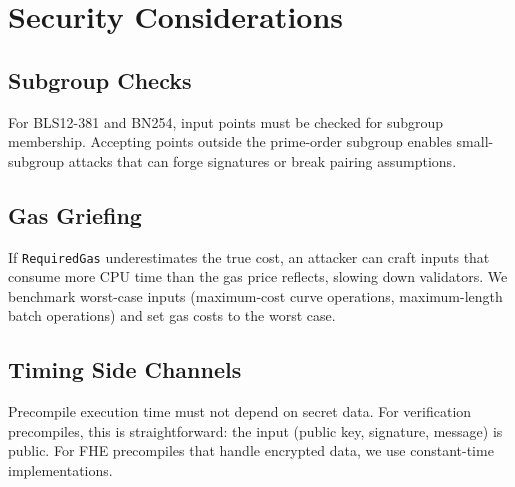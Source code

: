 \section{Security Considerations}


\subsection{Subgroup Checks}

For BLS12-381 and BN254, input points must be checked for subgroup membership.
Accepting points outside the prime-order subgroup enables small-subgroup attacks
that can forge signatures or break pairing assumptions.

\subsection{Gas Griefing}

If \texttt{RequiredGas} underestimates the true cost, an attacker can craft inputs
that consume more CPU time than the gas price reflects, slowing down validators.
We benchmark worst-case inputs (maximum-cost curve operations, maximum-length batch
operations) and set gas costs to the worst case.

\subsection{Timing Side Channels}

Precompile execution time must not depend on secret data. For verification precompiles,
this is straightforward: the input (public key, signature, message) is public. For FHE
precompiles that handle encrypted data, we use constant-time implementations.

